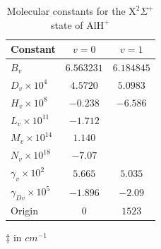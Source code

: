 \documentclass[twoside,twocolumn,9pt]{article}
\begin{document}
\begin{table}
\centering
\begin{minipage}[b]{0.45\linewidth}
\renewcommand*{\thempfootnote}{\fnsymbol{mpfootnote}}
\let\TPToverlap=\TPTrlap
\caption{Molecular constants for the $\mathrm{X}^2\Sigma^+$ state of $\mathrm{AlH}^+$\tnote{$\ddag$}}
\begin{threeparttable}
\renewcommand{\arraystretch}{1.25}
\setlength{\tabcolsep}{1em}
\begin{tabular}{lcc}
 \hline
Constant\cite{szajna2011high}     &    $ v=0$   &   $ v=1$    \\
 \hline
$B_{v}$                           &$6.563231$   &$6.184845$    \\   \hline
$D_{v}\times 10^{4}$              &$4.5720$     &$5.0983$      \\ \hline
$H_{v}\times 10^{8}$              &$-0.238$     &$-6.586$       \\ \hline
$L_{v}\times 10^{11}$             &$-1.712$     &               \\ \hline
$M_{v}\times 10^{14}$             &$1.140$      &               \\ \hline
$N_{v}\times 10^{18}$             &$-7.07$      &               \\ \hline
$\gamma_{v}\times 10^{2}$         &$5.665$      &$5.035$        \\ \hline
$\gamma_{Dv}\times 10^{5}$        &$-1.896$     &$-2.09$        \\ \hline
Origin                                          &$0$              &$1523$        \\ 
\hline
\end{tabular}
\begin{tablenotes}
\item[$\ddag$] in $cm^{-1}$
\end{tablenotes}
\end{threeparttable}
\label{Xparameters}


\end{minipage}
\end{table}
\end{document}
